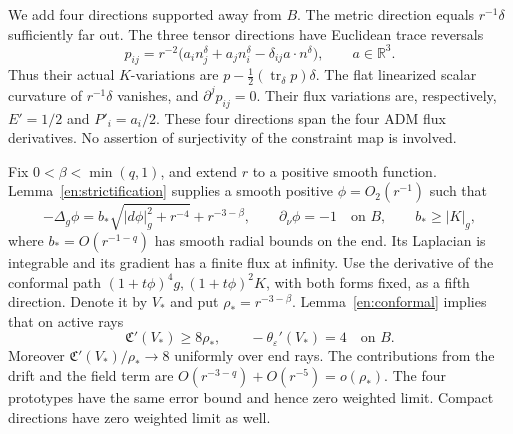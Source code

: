 We add four directions supported away from \(B\).  The metric direction
equals \(r^{-1}\delta\) sufficiently far out.  The three tensor directions
have Euclidean trace reversals
\begin{equation}\label{va:momentum-prototype}
 p_{ij}=r^{-2}\bigl(a_i n_j^\delta+a_jn_i^\delta
                         -\delta_{ij}a\cdot n^\delta\bigr),
 \qquad a\in\mathbb R^3.
\end{equation}
Thus their actual \(K\)-variations are
\(p-\tfrac12(\operatorname{tr}_\delta p)\delta\).
The flat linearized scalar curvature of \(r^{-1}\delta\) vanishes,
and \(\partial^jp_{ij}=0\).  Their flux variations are, respectively,
\(E'=1/2\) and \(P'_i=a_i/2\).  These four directions span the four ADM
flux derivatives.  No assertion of surjectivity of the constraint map is
involved.

Fix \(0<\beta<\min(q,1)\), and extend \(r\) to a positive smooth
function.  Lemma~\ref{en:strictification} supplies a smooth positive
\(\phi=O_2(r^{-1})\) such that
\begin{equation}\label{va:strict-lapse}
 -\Delta_g\phi=b_*\sqrt{|d\phi|_g^2+r^{-4}}+r^{-3-\beta},
 \qquad \partial_\nu\phi=-1\quad\text{on }B,
 \qquad b_*\ge |K|_g,
\end{equation}
where \(b_*=O(r^{-1-q})\) has smooth radial bounds on the end.
Its Laplacian is integrable and its gradient has a finite flux at infinity.
Use the derivative of the conformal path
\((1+t\phi)^4g,(1+t\phi)^2K\), with both forms fixed, as a fifth
direction.  Denote it by \(V_*\) and put \(\rho_*=r^{-3-\beta}\).
Lemma~\ref{en:conformal} implies that on active rays
\begin{equation}\label{va:strict-cone}
 \mathfrak C'(V_*)\ge8\rho_*,\qquad
 -\theta_\varepsilon'(V_*)=4\quad\text{on }B.
\end{equation}
Moreover \(\mathfrak C'(V_*)/\rho_*\to8\) uniformly over end rays.
The contributions from the drift and the field term are
\(O(r^{-3-q})+O(r^{-5})=o(\rho_*)\).
The four prototypes have the same error bound and hence zero weighted
limit.  Compact directions have zero weighted limit as well.

